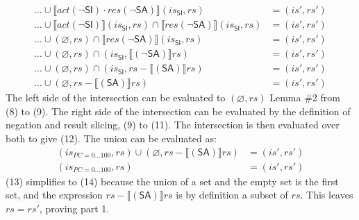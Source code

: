 \documentclass[12pt, letterpaper]{article}
\let\emptyset\varnothing
\begin{document}
 \begin{align}
     \ldots \cup %
     \llbracket \mathit{act}(\neg\mathsf{SI}) \cdot
      \mathit{res}(\neg\mathsf{SA}) \rrbracket (\mathit{is_{\mathsf{SI}}}, \mathit{rs})
     &=
     (\mathit{is}', \mathit{rs}')
     \\
     \ldots \cup %
     \llbracket \mathit{act}(\neg\mathsf{SI}) \rrbracket (\mathit{is_{\mathsf{SI}}}, \mathit{rs}) \cap
     \llbracket \mathit{res}(\neg\mathsf{SA}) \rrbracket (\mathit{is_{\mathsf{SI}}}, \mathit{rs})
     &=
     (\mathit{is}', \mathit{rs}')
     \\
     \ldots \cup 
     (\emptyset, \mathit{rs}) \cap
     \llbracket \mathit{res}(\neg\mathsf{SA}) \rrbracket (\mathit{is_{\mathsf{SI}}}, \mathit{rs})
     &=
     (\mathit{is}', \mathit{rs}')
     \\ %
     \ldots \cup 
     (\emptyset, \mathit{rs}) \cap
     (\mathit{is_{\mathsf{SI}}}, \llbracket (\neg\mathsf{SA}) \rrbracket \mathit{rs})
     &=
     (\mathit{is}', \mathit{rs}')
     \\
     \ldots \cup 
     (\emptyset, \mathit{rs}) \cap
     (\mathit{is_{\mathsf{SI}}}, \mathit{rs} - \llbracket (\mathsf{SA}) \rrbracket \mathit{rs})
     &=
     (\mathit{is}', \mathit{rs}') %
     \\
     \ldots \cup 
     (\emptyset, \mathit{rs} - \llbracket (\mathsf{SA}) \rrbracket \mathit{rs})
     &=
     (\mathit{is}', \mathit{rs}')
 \end{align}
     The left side of the intersection can be evaluated to $(\emptyset, \mathit{rs})$ Lemma \#2 from (8) to (9). The right side of the intersection can be evaluated by the definition of negation and result slicing, (9) to (11).  The intersection is then evaluated over both to give (12).  The union can be evaluated as:
 \begin{align}
     (\mathit{is_{PC=0\ldots100}}, \mathit{rs}) \cup 
     (\emptyset, \mathit{rs} - \llbracket (\mathsf{SA}) \rrbracket \mathit{rs})
     &=
     (\mathit{is}', \mathit{rs}')
     \\
     (\mathit{is_{PC=0\ldots100}}, \mathit{rs})
     &=
     (\mathit{is}', \mathit{rs}')
 \end{align} 
     (13) simplifies to (14) because the union of a set and the empty set is the first set, and the expression $\mathit{rs} - \llbracket (\mathsf{SA}) \rrbracket \mathit{rs}$ is by definition a subset of $\mathit{rs}$.  This leaves $\mathit{rs} = \mathit{rs}'$, proving part 1. 
\end{document}

